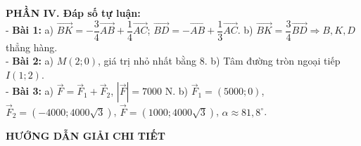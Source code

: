 \documentclass[10pt,a4paper]{article}
\begin{document}
\vspace{5pt}
\noindent\textbf{PHẦN IV. Đáp số tự luận:}\\[2pt]
- \textbf{Bài 1:} a) $\vec{BK} = -\dfrac{3}{4}\vec{AB} + \dfrac{1}{4}\vec{AC}$; $\vec{BD} = -\vec{AB} + \dfrac{1}{3}\vec{AC}$. b) $\vec{BK} = \dfrac{3}{4}\vec{BD} \Rightarrow B, K, D$ thẳng hàng.\\
- \textbf{Bài 2:} a) $M(2; 0)$, giá trị nhỏ nhất bằng $8$. b) Tâm đường tròn ngoại tiếp $I(1; 2)$.\\
- \textbf{Bài 3:} a) $\vec{F} = \vec{F}_1 + \vec{F}_2$, $|\vec{F}| = 7000\text{ N}$. b) $\vec{F}_1 = (5000; 0)$, $\vec{F}_2 = (-4000; 4000\sqrt{3})$, $\vec{F} = (1000; 4000\sqrt{3})$, $\alpha \approx 81{,}8^\circ$.

\vspace{4pt}
\begin{center}
  {\large\bfseries\color{ink} HƯỚNG DẪN GIẢI CHI TIẾT}
\end{center}
\vspace{1pt}
\end{document}
